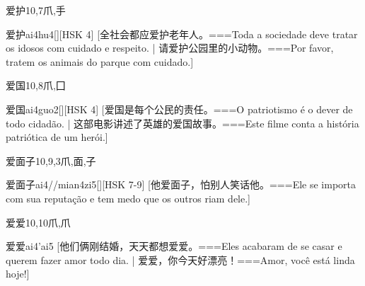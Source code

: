 \begin{Entry}{爱护}{10,7}{⽖,⼿}
  \begin{Phonetics}{爱护}{ai4hu4}[][HSK 4]
    [全社会都应爱护老年人。===Toda a sociedade deve tratar os idosos com cuidado e respeito. | 请爱护公园里的小动物。===Por favor, tratem os animais do parque com cuidado.]
  \end{Phonetics}
\end{Entry}

\begin{Entry}{爱国}{10,8}{⽖,⼞}
  \begin{Phonetics}{爱国}{ai4guo2}[][HSK 4]
    [爱国是每个公民的责任。===O patriotismo é o dever de todo cidadão. | 这部电影讲述了英雄的爱国故事。===Este filme conta a história patriótica de um herói.]
  \end{Phonetics}
\end{Entry}

\begin{Entry}{爱面子}{10,9,3}{⽖,⾯,⼦}
  \begin{Phonetics}{爱面子}{ai4//mian4zi5}[][HSK 7-9]
    [他爱面子，怕别人笑话他。===Ele se importa com sua reputação e tem medo que os outros riam dele.]
  \end{Phonetics}
\end{Entry}

\begin{Entry}{爱爱}{10,10}{⽖,⽖}
  \begin{Phonetics}{爱爱}{ai4'ai5}
    [他们俩刚结婚，天天都想爱爱。===Eles acabaram de se casar e querem fazer amor todo dia. | 爱爱，你今天好漂亮！===Amor, você está linda hoje!]
  \end{Phonetics}
\end{Entry}

